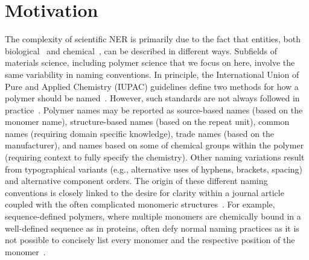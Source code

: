 \section{Motivation}
\label{sect:background}

The complexity of scientific NER is primarily due to the fact that entities,
both biological~\cite{kim2004introduction} and chemical~\cite{krallinger2015chemdner}, can be described in different ways. 
Subfields of materials science, including polymer science that we focus on here, involve the same variability in naming conventions.
In principle, the International Union of Pure and Applied Chemistry (IUPAC) guidelines define two 
methods for how a polymer should be named~\cite{hiorns2013brief}.
However, such standards are not always followed in practice~\cite{tamames2006success}.
Polymer names may be reported as source-based names (based on the monomer name), structure-based names (based on the repeat unit), common names (requiring domain specific knowledge), trade names (based on the manufacturer), and names based on some of chemical groups within the polymer (requiring context to fully specify the chemistry).
Other naming variations result from typographical variants (e.g., alternative uses of hyphens, brackets, spacing) and alternative component orders.
The origin of these different naming conventions is closely linked to the desire for clarity within a journal article coupled with the often complicated monomeric structures~\cite{audus2017polymer}.
For example, sequence-defined polymers, where multiple monomers are chemically bound in a well-defined sequence as in proteins, often defy normal naming practices as it is not possible to concisely list every monomer and the respective position of the monomer~\cite{lutz2014polymer}. 

